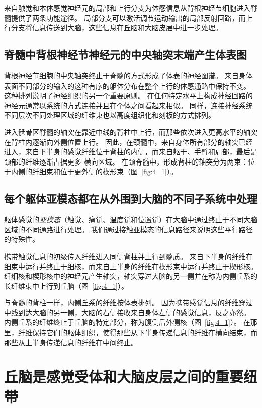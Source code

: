 来自触觉和本体感觉神经元的局部和上行分支为体感信息从背根神经节细胞进入脊髓提供了两条功能途径。 
局部分支可以激活调节运动输出的局部反射回路，而上行分支将信息传送到大脑，这些信息在丘脑和大脑皮层中进一步处理。



\subsection{脊髓中背根神经节神经元的中央轴突末端产生体表图}

背根神经节细胞的中央轴突终止于脊髓的方式形成了体表的神经图谱。
来自身体表面不同部分的输入的这种有序的躯体分布在整个上行的体感通路中保持不变。
这种排列说明了神经组织的另一个重要原则。
在任何特定水平上构成神经回路的神经元通常以系统的方式连接并且在个体之间看起来相似。 
同样，连接神经系统不同层次不同处理区域的纤维束也以高度组织化和刻板的方式排列。


进入骶骨区脊髓的轴突在靠近中线的背柱中上行，而那些依次进入更高水平的轴突在背柱内逐渐向外侧位置上行。 
因此，在颈髓中，来自身体所有部分的轴突已经进入，来自下半身的感觉纤维位于背柱的内侧，而来自躯干、手臂和肩部，最后是颈部的纤维逐渐占据更多 横向区域。 
在颈脊髓中，形成背柱的轴突分为两束：位于内侧的纤细束和位于更外侧的楔形束（图~\ref{fig:4_1}）。



\subsection{每个躯体亚模态都在从外围到大脑的不同子系统中处理}

躯体感觉的\textit{亚模态}（触觉、痛觉、温度觉和位置觉）在大脑中通过终止于不同大脑区域的不同通路进行处理。
我们通过接触亚模态的信息路径来说明这些平行路径的特殊性。


携带触觉信息的初级传入纤维进入同侧背柱并上行到髓质。
来自下半身的纤维在细束中运行并终止于细核，而来自上半身的纤维在楔形束中运行并终止于楔形核。 
纤细核和楔形核中的神经元产生轴突，轴突穿过大脑的另一侧并在称为内侧丘系的长纤维束中上行到丘脑（图~\ref{fig:4_1}）。


与脊髓的背柱一样，内侧丘系的纤维按体表排列。
因为携带感觉信息的纤维穿过中线到达大脑的另一侧，大脑的右侧接收来自身体左侧的感觉信息，反之亦然。 
内侧丘系的纤维终止于丘脑的特定部分，称为腹侧后外侧核（图~\ref{fig:4_1}）。 
在那里，纤维保持它们的躯体组织，使得那些从下半身传递信息的纤维在横向结束，而那些从上半身传递信息的纤维在中间终止。



\section{丘脑是感觉受体和大脑皮层之间的重要纽带}

